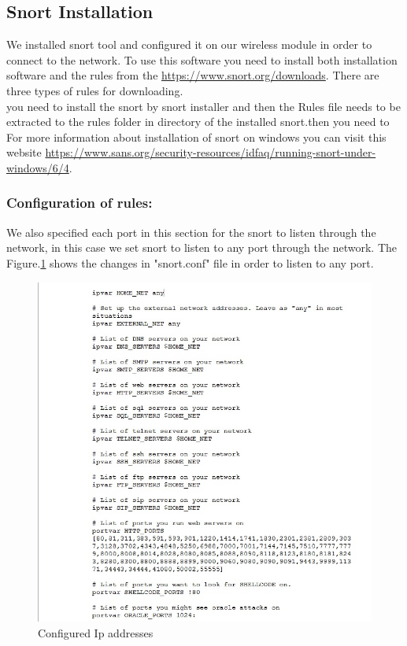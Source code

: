 \documentclass{article}
\begin{document}
\subsection{Snort Installation}
We installed snort tool and configured it on our wireless module in order to connect to the network.
To use this software you need to install both installation software and the rules from the \url{https://www.snort.org/downloads}. There are three types of rules for downloading.\\

you need to install the snort by snort installer and then the Rules file needs to be extracted to the rules folder in directory of the installed snort.then you need to For more information about installation of snort on windows you can visit this website \url{https://www.sans.org/security-resources/idfaq/running-snort-under-windows/6/4}.\\

\subsubsection{Configuration of rules:}
We also specified each port in this section for the snort to listen through the network, in this case we set snort to listen to any port through the network. The Figure.\ref{fig:Ipconf} shows the changes in "snort.conf" file in order to listen to any port.

\begin{figure}[H]
	\begin{center}
		\includegraphics[width=0.6
		\textwidth]{Ipconf.jpg}
	\end{center}
	\caption{Configured Ip addresses}
	\label{fig:Ipconf}
\end{figure}
\end{document}
